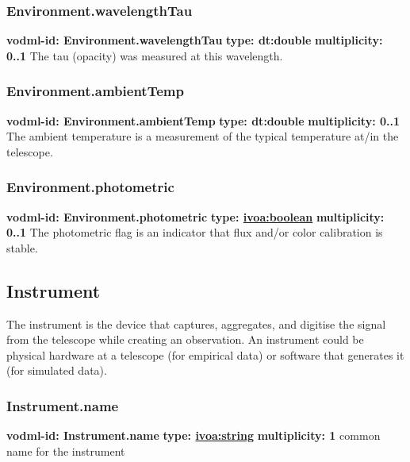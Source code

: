     \subsubsection{Environment.wavelengthTau}
      \textbf{vodml-id: Environment.wavelengthTau} \newline
      \textbf{type: dt:double} \newline
      \textbf{multiplicity: 0..1} \newline
      The tau (opacity) was measured at this wavelength.

    \subsubsection{Environment.ambientTemp}
      \textbf{vodml-id: Environment.ambientTemp} \newline
      \textbf{type: dt:double} \newline
      \textbf{multiplicity: 0..1} \newline
      The ambient temperature is a measurement of the typical temperature at/in the telescope.

    \subsubsection{Environment.photometric}
      \textbf{vodml-id: Environment.photometric} \newline
      \textbf{type: \hyperref[sect:ivoa]{ivoa:boolean}} \newline
      \textbf{multiplicity: 0..1} \newline
      The photometric flag is an indicator that flux and/or color calibration is stable.

  \subsection{Instrument}
  \label{sect:Instrument}
    The instrument is the device that captures, aggregates, and digitise the signal from the telescope while creating an observation. An instrument could be physical hardware at a telescope (for empirical data) or software that generates it (for simulated data).

    \subsubsection{Instrument.name}
      \textbf{vodml-id: Instrument.name} \newline
      \textbf{type: \hyperref[sect:ivoa]{ivoa:string}} \newline
      \textbf{multiplicity: 1} \newline
      common name for the instrument

